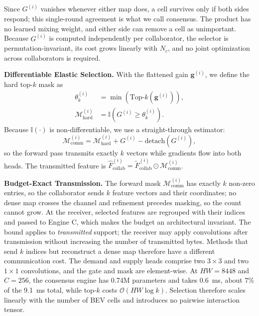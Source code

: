 Since $G^{(i)}$ vanishes whenever either map does, a cell survives only if both sides respond; this single-round agreement is what we call consensus. The product has no learned mixing weight, and either side can remove a cell as unimportant. Because $G^{(i)}$ is computed independently per collaborator, the selector is permutation-invariant, its cost grows linearly with $N_c$, and no joint optimization across collaborators is required.

\noindent\textbf{Differentiable Elastic Selection.}
With the flattened gain $\mathbf{g}^{(i)}$, we define the hard top-$k$ mask as
\begin{equation}
\begin{split}
  \theta_k^{(i)} &= \min(\mathrm{Top}\text{-}k(\mathbf{g}^{(i)})),\\
  \mathcal{M}_{\text{hard}}^{(i)} &= \mathbb{I}(G^{(i)} \ge \theta_k^{(i)}).
\end{split}
\label{eq:hardmask}
\end{equation}
Because $\mathbb{I}(\cdot)$ is non-differentiable, we use a straight-through estimator:
\begin{equation}
  \mathcal{M}_{\text{comm}}^{(i)} = \mathcal{M}_{\text{hard}}^{(i)} + G^{(i)} - \mathrm{detach}(G^{(i)}),
  \label{eq:ste}
\end{equation}
so the forward pass transmits exactly $k$ vectors while gradients flow into both heads. The transmitted feature is $\widehat{F}_{\text{collab}}^{(i)} = \widetilde{F}_{\text{collab}}^{(i)} \odot \mathcal{M}_{\text{comm}}^{(i)}$.

\noindent\textbf{Budget-Exact Transmission.}
The forward mask $\mathcal{M}_{\text{comm}}^{(i)}$ has exactly $k$ non-zero entries, so the collaborator sends $k$ feature vectors and their coordinates; no dense map crosses the channel and refinement precedes masking, so the count cannot grow. At the receiver, selected features are regrouped with their indices and passed to Engine C, which makes the budget an architectural invariant. The bound applies to \emph{transmitted} support; the receiver may apply convolutions after transmission without increasing the number of transmitted bytes. Methods that send $k$ indices but reconstruct a dense map therefore have a different communication cost. The demand and supply heads comprise two $3{\times}3$ and two $1{\times}1$ convolutions, and the gate and mask are element-wise. At $HW{=}8448$ and $C{=}256$, the consensus engine has 0.74M parameters and takes 0.6~ms, about $7\%$ of the 9.1~ms total, while top-$k$ costs $\mathcal{O}(HW\log k)$. Selection therefore scales linearly with the number of BEV cells and introduces no pairwise interaction tensor.
